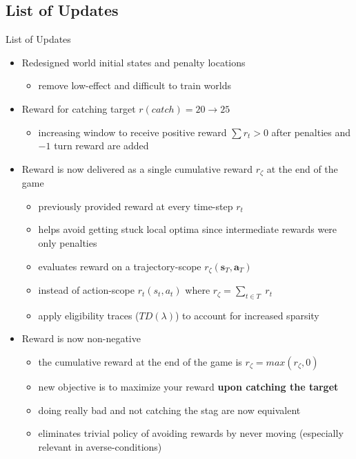 \documentclass[aspectratio=1610, xcolor=dvipsnames]{packages/beamer}
\begin{document}
\subsection{List of Updates}
\begin{frame}{List of Updates}
    \begin{itemize}
        \item Redesigned world initial states and penalty locations
        \begin{itemize}
            \item remove low-effect and difficult to train worlds
        \end{itemize}
        \item Reward for catching target $r(catch)= 20 \rightarrow 25$
        \begin{itemize}
            \item increasing window to receive positive reward $\sum r_{t} >0$ after penalties and $-1$ turn reward are added
        \end{itemize}
        \item Reward is now delivered as a single cumulative reward $r_\zeta$ at the end of the game
        \begin{itemize}
            \item previously provided reward at every time-step $r_{t}$
            \item helps avoid getting stuck local optima since intermediate rewards were only penalties
            \item evaluates reward on a trajectory-scope $r_\zeta(\mathbf{s}_T,\mathbf{a}_T)$
            \item instead of action-scope $r_{t}(s_t,a_t)$ where $r_\zeta = \sum_{t\in T} \; r_t$
            \item apply eligibility traces ($TD(\lambda)$) to account for increased sparsity
        \end{itemize}
        \item Reward is now non-negative
        \begin{itemize}
            \item the cumulative reward at the end of the game is $r_\zeta = max(r_\zeta,0)$
            \item new objective is to maximize your reward \textbf{upon catching the target}
            \item doing really bad and not catching the stag are now equivalent
            \item eliminates trivial policy of avoiding rewards by never moving (especially relevant in averse-conditions)
        \end{itemize}
    \end{itemize}
\end{frame}
\end{document}
